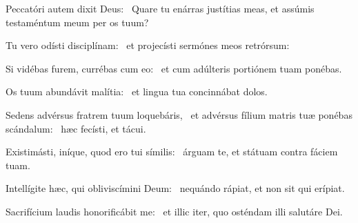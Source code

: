 
\item Peccatóri autem dixit Deus:~\psstar{} Quare tu enárras justítias meas, et assúmis testaméntum meum per os tuum?

\item Tu vero odísti disciplínam:~\psstar{} et projecísti sermónes meos retrórsum:

\item Si vidébas furem, currébas cum eo:~\psstar{} et cum adúlteris portiónem tuam ponébas.

\item Os tuum abundávit malítia:~\psstar{} et lingua tua concinnábat dolos.

\item Sedens advérsus fratrem tuum loquebáris,~\pscross{} et advérsus fílium matris tuæ ponébas scándalum:~\psstar{} hæc fecísti, et tácui.

\item Existimásti, iníque, quod ero tui símilis:~\psstar{} árguam te, et státuam contra fáciem tuam.

\item Intellígite hæc, qui obliviscímini Deum:~\psstar{} nequándo rápiat, et non sit qui erípiat.

\item Sacrifícium laudis honorificábit me:~\psstar{} et illic iter, quo osténdam illi salutáre Dei.